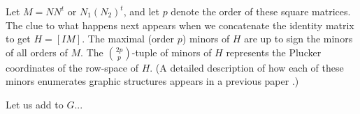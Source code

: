 
Let $M=N N^t$ or $N_1 (N_2)^t$, and let $p$ denote the order of these square matrices.
The clue to what happens next appears when
we concatenate the identity matrix to get $H=[I M]$.  The maximal (order $p$)
minors of $H$ are up to sign the minors of all orders of $M$.  The $\binom{2p}{p}$-tuple
of minors of $H$ represents the Plucker coordinates of the row-space of $H$.  (A detailed
description of how each of these minors enumerates graphic structures appears in
a previous paper \cite{}.)

Let us add to $G$...




